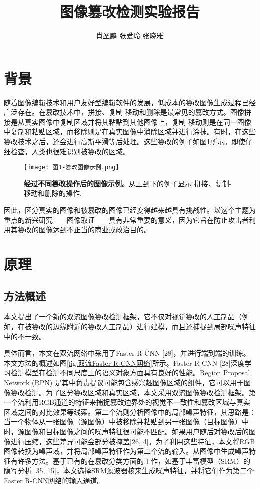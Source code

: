 \documentclass[a4paper]{article}
\title{图像篡改检测实验报告}
\author{肖圣鹏 \space 张爱玲 \space 张晓雅}
\begin{document}
\maketitle

\section{背景}
随着图像编辑技术和用户友好型编辑软件的发展，低成本的篡改图像生成过程已经广泛存在。在篡改技术中，拼接、复制-移动和删除是最常见的篡改方式。图像拼接是从真实图像中复制区域并将其粘贴到其他图像上，复制-移动则是在同一图像中复制和粘贴区域，而移除则是在真实图像中消除区域并进行涂抹。有时，在这些篡改技术之后，还会进行高斯平滑等后处理。这些篡改的例子如图\ref{fig:篡改图像示例}所示。即使仔细检查，人类也很难识别被篡改的区域。

\begin{figure}[H]
\centering
\texttt{[image: 图1-篡改图像示例.png]}
\caption{\label{fig:篡改图像示例}\textbf{经过不同篡改操作后的图像示例。}从上到下的例子显示
拼接、复制-移动和删除的操作.}
\end{figure}

因此，区分真实的图像和被篡改的图像已经变得越来越具有挑战性。以这个主题为重点的新兴研究——图像取证——具有非常重要的意义，因为它旨在防止攻击者利用其篡改的图像达到不正当的商业或政治目的。

\section{原理}
\subsection{方法概述}
本文提出了一个新的双流图像篡改检测框架，它不仅对视觉篡改的人工制品（例如，在被篡改的边缘附近的篡改人工制品）进行建模，而且还捕捉到局部噪声特征中的不一致。

具体而言，本文在双流网络中采用了Faster R-CNN [28]，并进行端到端的训练。本文方法的概述如图\ref{fig:双流Faster R-CNN网络}所示。Faster R-CNN [28]深度学习检测模型在检测不同尺度上的语义对象方面具有良好的性能。Region Proposal Network (RPN) 是其中负责提议可能包含感兴趣图像区域的组件，它可以用于图像篡改检测。为了区分篡改区域和真实区域，本文采用双流图像篡改检测框架。第一个流利用RGB通道的特征来捕捉篡改边界处的视觉不一致性和篡改区域与真实区域之间的对比效果等线索。第二个流则分析图像中的局部噪声特征，其思路是：当一个物体从一张图像（源图像）中被移除并粘贴到另一张图像（目标图像）中时，源图像和目标图像之间的噪声特征很可能不匹配。如果用户随后对篡改后的图像进行压缩，这些差异可能会部分被掩盖[26, 4]。为了利用这些特征，本文将RGB图像转换为噪声域，并将局部噪声特征作为第二个流的输入。从图像中生成噪声特征有许多方法。基于已有的在篡改分类方面的工作，如基于丰富模型（SRM）的隐写分析 [35, 15]，本文选择SRM滤波器核来生成噪声特征，并将它们作为第二个Faster R-CNN网络的输入通道。
\end{document}

